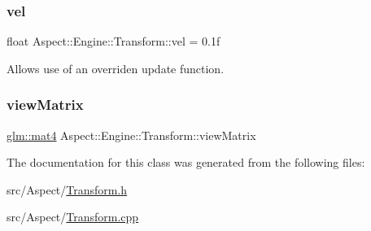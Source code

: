 \subsubsection{\texorpdfstring{vel}{vel}}
{\footnotesize\ttfamily float Aspect\+::\+Engine\+::\+Transform\+::vel = 0.\+1f}



Allows use of an overriden update function. 

\mbox{\label{class_aspect_1_1_engine_1_1_transform_af56074cbe77a1b2fcdb5e077eaa33660}} 
\subsubsection{\texorpdfstring{view\+Matrix}{viewMatrix}}
{\footnotesize\ttfamily \mbox{\hyperlink{group__core__types_ga7dcd2365c2e368e6af5b7adeb6a9c8df}{glm\+::mat4}} Aspect\+::\+Engine\+::\+Transform\+::view\+Matrix\hspace{0.3cm}{\ttfamily [private]}}



The documentation for this class was generated from the following files\+:\begin{DoxyCompactItemize}
\item 
src/\+Aspect/\mbox{\hyperlink{_transform_8h}{Transform.\+h}}\item 
src/\+Aspect/\mbox{\hyperlink{_transform_8cpp}{Transform.\+cpp}}\end{DoxyCompactItemize}
